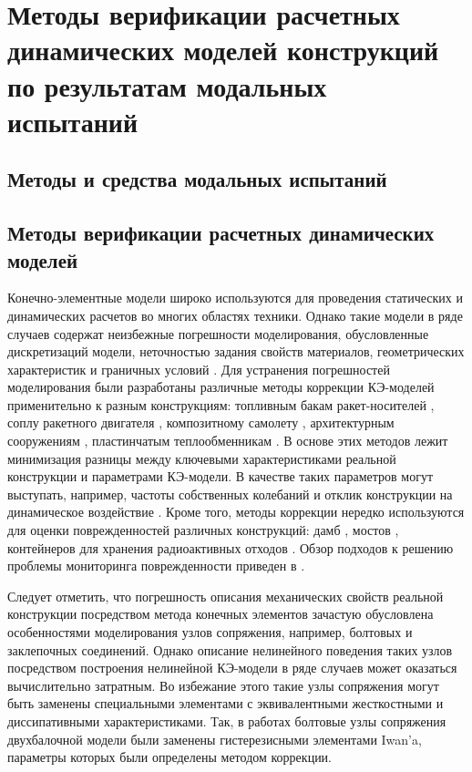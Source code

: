 \chapter{Методы верификации расчетных динамических моделей конструкций по результатам модальных испытаний}

\section{Методы и средства модальных испытаний}


\section{Методы верификации расчетных динамических моделей} 

Конечно-элементные модели широко используются для проведения статических и динамических расчетов во многих областях техники. Однако такие модели в ряде случаев содержат неизбежные погрешности моделирования, обусловленные дискретизаций модели, неточностью задания свойств материалов, геометрических характеристик и граничных условий \cite{lib:modelUpdating:Bartilson}. Для устранения погрешностей моделирования были разработаны различные методы коррекции КЭ-моделей применительно к разным конструкциям: топливным бакам ракет-носителей \cite{lib:modelUpdating:Li&Tian}, соплу ракетного двигателя \cite{lib:modelUpdating:Yan&Li}, композитному самолету \cite{lib:modelUpdating:Zhao&Gupta}, архитектурным сооружениям \cite{lib:modelUpdating:Girardi&Padovani}, пластинчатым теплообменникам \cite{lib:modelUpdating:Guo&Wang}. В основе этих методов лежит минимизация разницы между ключевыми характеристиками реальной конструкции и параметрами КЭ-модели. В качестве таких параметров могут выступать, например, частоты собственных колебаний и отклик конструкции на динамическое воздействие \cite{lib:modelUpdating:Petersen&Oiseth}. Кроме того, методы коррекции нередко используются для оценки поврежденностей различных конструкций: дамб \cite{lib:modelUpdating:Bayraktar&Sevim}, мостов \cite{lib:modelUpdating:Cong&Thoi, lib:modelUpdating:Polanco}, контейнеров для хранения радиоактивных отходов \cite{lib:modelUpdating:Eiras}. Обзор подходов к решению проблемы мониторинга поврежденности приведен в \cite{lib:modelUpdating:Simoen}. 

Следует отметить, что погрешность описания механических свойств реальной конструкции посредством метода конечных элементов зачастую обусловлена особенностями моделирования узлов сопряжения, например, болтовых и заклепочных соединений. Однако описание нелинейного поведения таких узлов посредством построения нелинейной КЭ-модели в ряде случаев может оказаться вычислительно затратным. Во избежание этого такие узлы сопряжения могут быть заменены специальными элементами с эквивалентными жесткостными и диссипативными характеристиками. Так, в работах \cite{lib:modelUpdating:Lacayo, lib:modelUpdating:Yuan} болтовые узлы сопряжения двухбалочной модели были заменены гистерезисными элементами Iwan’a, параметры которых были определены методом коррекции. 

